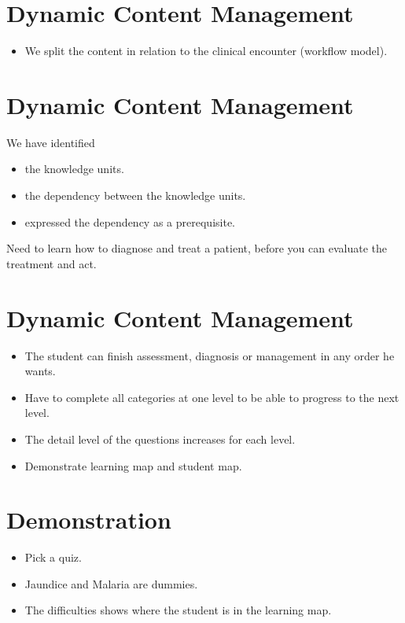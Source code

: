 \documentclass[20pt]{extarticle}
\begin{document}
	\section{Dynamic Content Management}
	\begin{itemize}
		\item We split the content in relation to the clinical encounter (workflow model).
	\end{itemize}

	\section{Dynamic Content Management}
	We have identified
	\begin{itemize}
		\item  the knowledge units.
		\item the dependency between the knowledge units.
		\item expressed the dependency as a prerequisite.
	\end{itemize}
	Need to learn how to diagnose and treat a patient, before you can evaluate the treatment and act.

	\section{Dynamic Content Management}
	\begin{itemize}
		\item The student can finish assessment, diagnosis or management in any order he wants.
		\item Have to complete all categories at one level to be able to progress to the next level.
		\item The detail level of the questions increases for each level.
		\item Demonstrate learning map and student map. 
	\end{itemize}

	\section{Demonstration}
	\begin{itemize}
		\item Pick a quiz.
		\item Jaundice and Malaria are dummies.
		\item The difficulties shows where the student is in the learning map.
	\end{itemize}
\end{document}
